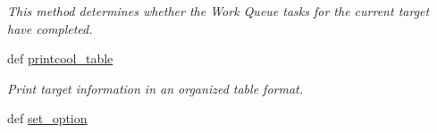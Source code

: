 \begin{DoxyCompactItemize}
\begin{DoxyCompactList}\small\item\em This method determines whether the Work Queue tasks for the current target have completed. \end{DoxyCompactList}\item 
def \hyperlink{classforcebalance_1_1target_1_1Target_ac30a4e9d7d9fe06f7caefa5f7cfab09b}{printcool\-\_\-table}
\begin{DoxyCompactList}\small\item\em Print target information in an organized table format. \end{DoxyCompactList}\item 
def \hyperlink{classforcebalance_1_1baseclass_1_1ForceBalanceBaseClass_abaaf4d99b043d41f02fabc41db59252b}{set\-\_\-option}
\end{DoxyCompactItemize}
